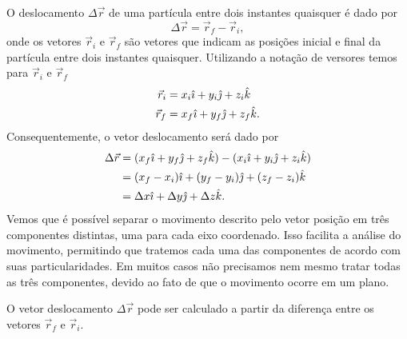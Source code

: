 O deslocamento $\Delta \vec{r}$ de uma partícula entre dois instantes quaisquer é dado por
\begin{equation}
  \Delta\vec{r} = \vec{r}_f - \vec{r}_i,
\end{equation}
%
onde os vetores $\vec{r}_i$ e $\vec{r}_f$ são vetores que indicam as posições inicial e final da partícula entre dois instantes quaisquer. Utilizando a notação de versores temos para $\vec{r}_i$ e $\vec{r}_f$
\begin{align}
  \vec{r}_i &= x_i \hat{\imath} + y_i \hat{\jmath} + z_i \hat{k} \\
  \vec{r}_f &= x_f \hat{\imath} + y_f \hat{\jmath} + z_f \hat{k}.
\end{align}
%
Consequentemente, o vetor deslocamento será dado por
\begin{align}
  \Delta\vec{r} &= (x_f \hat{\imath} + y_f \hat{\jmath} + z_f \hat{k}) - (x_i \hat{\imath} + y_i \hat{\jmath} + z_i \hat{k}) \\
  &= (x_f - x_i)\hat{\imath} + (y_f - y_i)\hat{\jmath} + (z_f - z_i)\hat{k} \\
  &= \Delta x\hat{\imath} + \Delta y\hat{\jmath} + \Delta z\hat{k}.
\end{align}
%
Vemos que é possível separar o movimento descrito pelo vetor posição em três componentes distintas, uma para cada eixo coordenado. Isso facilita a análise do movimento, permitindo que tratemos cada uma das componentes de acordo com suas particularidades. Em muitos casos não precisamos nem mesmo tratar todas as três componentes, devido ao fato de que o movimento ocorre em um plano.
 
\begin{marginfigure}[-10cm]
\centering
{}
\caption{O vetor deslocamento $\Delta \vec{r}$ pode ser calculado a partir da diferença entre os vetores $\vec{r}_f$ e $\vec{r}_i$.}
\end{marginfigure}

